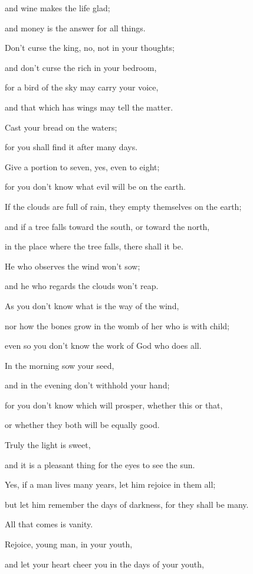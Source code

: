 and wine makes the life glad;

and money is the answer for all things.

\myverse{}Don’t curse the king, no, not in your thoughts;

and don’t curse the rich in your bedroom,

for a bird of the sky may carry your voice,

and that which has wings may tell the matter.


\mychapter{}\myverse*{}Cast your bread on the waters;

\quad\quad for you shall find it after many days.

\myverse{}Give a portion to seven, yes, even to eight;

for you don’t know what evil will be on the earth.

\myverse{}If the clouds are full of rain, they empty themselves on the
earth;

and if a tree falls toward the south, or toward the north,

in the place where the tree falls, there shall it be.

\myverse{}He who observes the wind won’t sow;

and he who regards the clouds won’t reap.

\myverse{}As you don’t know what is the way of the wind,

nor how the bones grow in the womb of her who is with child;

even so you don’t know the work of God who does all.

\myverse{}In the morning sow your seed,

and in the evening don’t withhold your hand;

for you don’t know which will prosper, whether this or that,

or whether they both will be equally good.

\myverse{}Truly the light is sweet,

and it is a pleasant thing for the eyes to see the sun.

\myverse{}Yes, if a man lives many years, let him rejoice in them all;

but let him remember the days of darkness, for they shall be many.

All that comes is vanity.

\myverse{}Rejoice, young man, in your youth,

and let your heart cheer you in the days of your youth,

